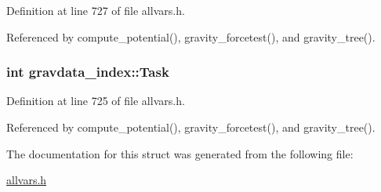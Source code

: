 Definition at line 727 of file allvars.h.



Referenced by compute\_\-potential(), gravity\_\-forcetest(), and gravity\_\-tree().

\hypertarget{structgravdata__index_afacf7009bcd9677cf8ddff3dc927d6c5}{
\subsubsection[{Task}]{\setlength{\rightskip}{0pt plus 5cm}int {\bf gravdata\_\-index::Task}}}
\label{structgravdata__index_afacf7009bcd9677cf8ddff3dc927d6c5}


Definition at line 725 of file allvars.h.



Referenced by compute\_\-potential(), gravity\_\-forcetest(), and gravity\_\-tree().



The documentation for this struct was generated from the following file:\begin{DoxyCompactItemize}
\item 
\hyperlink{allvars_8h}{allvars.h}\end{DoxyCompactItemize}
